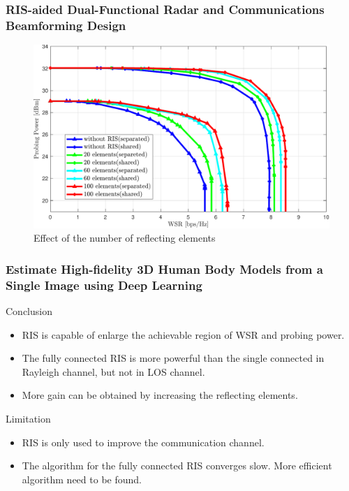 \begin{frame}
    \frametitle{RIS-aided Dual-Functional Radar and Communications Beamforming Design}
    \begin{figure}
        \centering
        \includegraphics[width=0.7\linewidth]{./img/elements.pdf}
        \caption{Effect of the number of reflecting elements}
    \end{figure}
\end{frame}

\begin{frame}
    \frametitle{Estimate High-fidelity 3D Human Body Models from a Single Image using Deep Learning}
    \begin{block}{Conclusion}
        \begin{itemize}
        \small
        \item RIS is capable of enlarge the achievable region of WSR and probing power.
        \item The fully connected RIS is more powerful than the single connected in Rayleigh channel, but not in LOS channel.        
        \item More gain can be obtained by increasing the reflecting elements.
        \end{itemize}    
    \end{block}
    \begin{block}{Limitation}
        \begin{itemize}
        \small
        \item RIS is only used to improve the communication channel.
        \item The algorithm for the fully connected RIS converges slow. More efficient algorithm need to be found.
        \end{itemize}    
    \end{block}
\end{frame}
